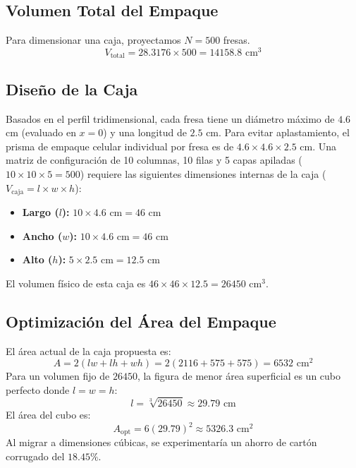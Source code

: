 \documentclass[conference, Spanish]{IEEEtran}
\begin{document}
\subsection{Volumen Total del Empaque}
Para dimensionar una caja, proyectamos $N = 500$ fresas.
\begin{equation}
V_{\text{total}} = 28.3176 \times 500 = 14158.8 \text{ cm}^3
\end{equation}

\subsection{Diseño de la Caja}
Basados en el perfil tridimensional, cada fresa tiene un diámetro máximo de $4.6$ cm (evaluado en $x=0$) y una longitud de $2.5$ cm. Para evitar aplastamiento, el prisma de empaque celular individual por fresa es de $4.6 \times 4.6 \times 2.5$ cm.
Una matriz de configuración de 10 columnas, 10 filas y 5 capas apiladas ($10 \times 10 \times 5 = 500$) requiere las siguientes dimensiones internas de la caja ($V_{\text{caja}} = l \times w \times h$):
\begin{itemize}
    \item \textbf{Largo ($l$):} $10 \times 4.6 \text{ cm} = 46 \text{ cm}$
    \item \textbf{Ancho ($w$):} $10 \times 4.6 \text{ cm} = 46 \text{ cm}$
    \item \textbf{Alto ($h$):} $5 \times 2.5 \text{ cm} = 12.5 \text{ cm}$
\end{itemize}
El volumen físico de esta caja es $46 \times 46 \times 12.5 = 26450 \text{ cm}^3$.

\subsection{Optimización del Área del Empaque}
El área actual de la caja propuesta es:
\begin{equation}
A = 2(lw + lh + wh) = 2(2116 + 575 + 575) = 6532 \text{ cm}^2
\end{equation}
Para un volumen fijo de $26450$, la figura de menor área superficial es un cubo perfecto donde $l=w=h$:
\begin{equation}
l = \sqrt[3]{26450} \approx 29.79 \text{ cm}
\end{equation}
El área del cubo es:
\begin{equation}
A_{\text{opt}} = 6(29.79)^2 \approx 5326.3 \text{ cm}^2
\end{equation}
Al migrar a dimensiones cúbicas, se experimentaría un ahorro de cartón corrugado del $18.45\%$.
\end{document}
